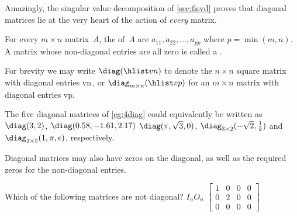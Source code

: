 Amazingly, the singular value decomposition of \autoref{sec:fisvd} proves that diagonal matrices lie at the very heart of the action of \emph{every} matrix.

\begin{definition} \label{def:diag} 
For every \(m\times n\) matrix~\(A\), the  of~\(A\) are \(a_{11},a_{22},\ldots,a_{pp}\) where \(p=\min(m,n)\).
A matrix whose non-diagonal entries are all zero is called a .

For brevity we may write \(\diag(\hlist vn)\) to denote the \(n\times n\) square matrix with diagonal entries \hlist vn\,, or \(\diag_{m\times n}(\hlist vp)\) for an \(m\times n\) matrix with diagonal entries \hlist vp.
\end{definition}

\begin{example} \label{eg:} \sloppy
The five diagonal matrices of \autoref{eg:4diag} could equivalently be written as \(\diag(3,2)\), \(\diag(0.58,-1.61,2.17)\) \(\diag(\pi,\sqrt3,0)\), \(\diag_{3\times2}(-\sqrt2,\tfrac12)\) and \(\diag_{3\times5}(1,\pi,e)\), respectively.
\end{example}


Diagonal matrices may also have zeros on the diagonal, as well as the required zeros for the non-diagonal entries.


\begin{activity}
Which of the following matrices are not diagonal?
{\(I_n\)}{\(O_n\)}
{\(\begin{bmatrix} 1&0&0&0
\\0&2&0&0
\\0&0&0&0 \end{bmatrix}\)}
\end{activity}
  


